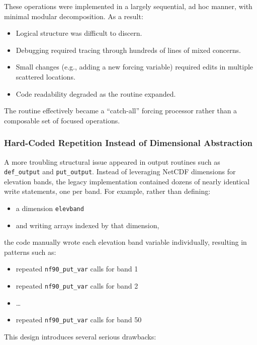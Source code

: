 \documentclass[11pt]{scrartcl}
\begin{document}
These operations were implemented in a largely sequential, ad hoc manner,
with minimal modular decomposition. As a result:

\begin{itemize}
\item Logical structure was difficult to discern.
\item Debugging required tracing through hundreds of lines of mixed concerns.
\item Small changes (e.g., adding a new forcing variable) required edits
      in multiple scattered locations.
\item Code readability degraded as the routine expanded.
\end{itemize}

The routine effectively became a ``catch-all'' forcing processor rather than
a composable set of focused operations.

\subsubsection{Hard-Coded Repetition Instead of Dimensional Abstraction}

A more troubling structural issue appeared in output routines such as
\texttt{def\_output} and \texttt{put\_output}. Instead of leveraging
NetCDF dimensions for elevation bands, the legacy implementation contained
dozens of nearly identical write statements, one per band. For example,
rather than defining:

\begin{itemize}
\item a dimension \texttt{elevband}
\item and writing arrays indexed by that dimension,
\end{itemize}

the code manually wrote each elevation band variable individually,
resulting in patterns such as:

\begin{itemize}
\item repeated \texttt{nf90\_put\_var} calls for band 1
\item repeated \texttt{nf90\_put\_var} calls for band 2
\item \ldots
\item repeated \texttt{nf90\_put\_var} calls for band 50
\end{itemize}

This design introduces several serious drawbacks:
\end{document}
